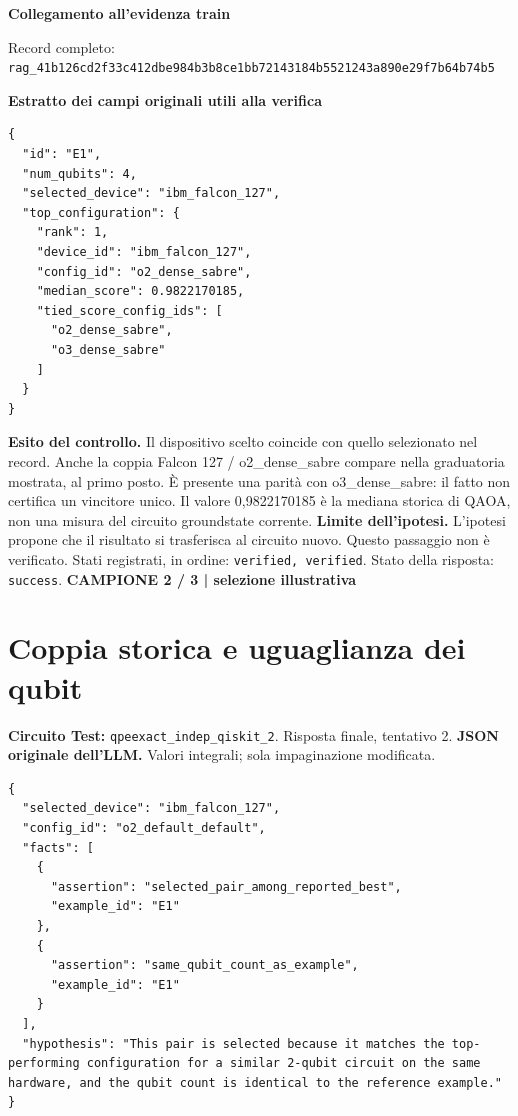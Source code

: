 \documentclass[a4paper,10pt]{article}
\newcommand{\tagline}[1]{{\small\color{ink}\textbf{#1}}\par}
\begin{document}
\textbf{Collegamento all'evidenza train}
\begin{center}\end{center}
{\footnotesize Record completo: \texttt{rag\_41b126cd2f33c412dbe984b3b8ce1bb72143184b5521243a890e29f7b64b74b5}}\par
\textbf{Estratto dei campi originali utili alla verifica}
\begin{lstlisting}
{
  "id": "E1",
  "num_qubits": 4,
  "selected_device": "ibm_falcon_127",
  "top_configuration": {
    "rank": 1,
    "device_id": "ibm_falcon_127",
    "config_id": "o2_dense_sabre",
    "median_score": 0.9822170185,
    "tied_score_config_ids": [
      "o2_dense_sabre",
      "o3_dense_sabre"
    ]
  }
}
\end{lstlisting}

\textbf{Esito del controllo.} Il dispositivo scelto coincide con quello selezionato nel record. Anche la coppia Falcon 127 / o2\_dense\_sabre compare nella graduatoria mostrata, al primo posto. È presente una parità con o3\_dense\_sabre: il fatto non certifica un vincitore unico. Il valore 0,9822170185 è la mediana storica di QAOA, non una misura del circuito groundstate corrente.
{\color{warn}\textbf{Limite dell'ipotesi.}} L'ipotesi propone che il risultato si trasferisca al circuito nuovo. Questo passaggio non è verificato.
{\small Stati registrati, in ordine: \texttt{verified, verified}. Stato della risposta: \texttt{success}.}
\newpage
\tagline{CAMPIONE 2 / 3 | selezione illustrativa}
\section*{Coppia storica e uguaglianza dei qubit}
\textbf{Circuito Test:} \texttt{qpeexact\_indep\_qiskit\_2}. Risposta finale, tentativo 2.
\textbf{JSON originale dell'LLM.} Valori integrali; sola impaginazione modificata.
\begin{lstlisting}
{
  "selected_device": "ibm_falcon_127",
  "config_id": "o2_default_default",
  "facts": [
    {
      "assertion": "selected_pair_among_reported_best",
      "example_id": "E1"
    },
    {
      "assertion": "same_qubit_count_as_example",
      "example_id": "E1"
    }
  ],
  "hypothesis": "This pair is selected because it matches the top-performing configuration for a similar 2-qubit circuit on the same hardware, and the qubit count is identical to the reference example."
}
\end{lstlisting}
\end{document}
